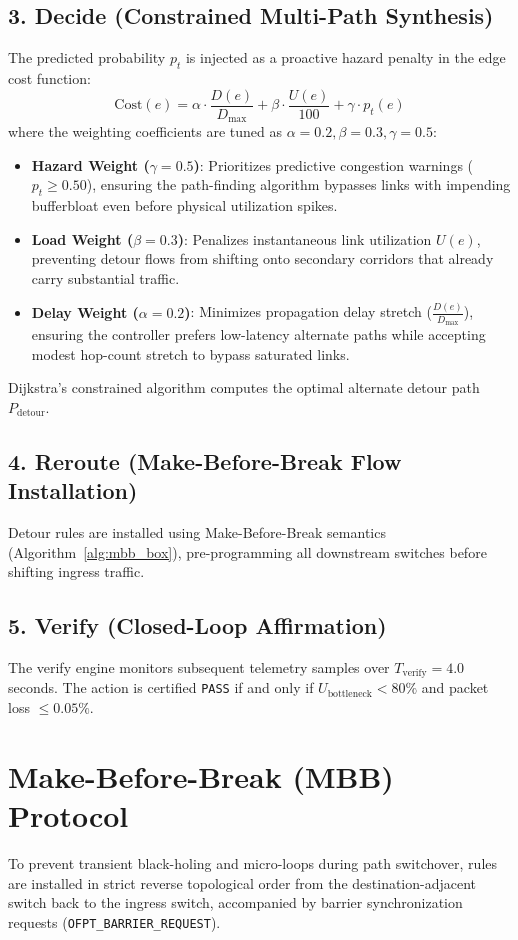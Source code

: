 \subsection{3. Decide (Constrained Multi-Path Synthesis)}
The predicted probability $p_t$ is injected as a proactive hazard penalty in the edge cost function:
\begin{equation}
  \text{Cost}(e) = \alpha \cdot \frac{D(e)}{D_{\text{max}}} + \beta \cdot \frac{U(e)}{100} + \gamma \cdot p_t(e)
\end{equation}
where the weighting coefficients are tuned as $\alpha=0.2, \beta=0.3, \gamma=0.5$:
\begin{itemize}[noitemsep]
  \item \textbf{Hazard Weight ($\gamma = 0.5$)}: Prioritizes predictive congestion warnings ($p_t \ge 0.50$), ensuring the path-finding algorithm bypasses links with impending bufferbloat even before physical utilization spikes.
  \item \textbf{Load Weight ($\beta = 0.3$)}: Penalizes instantaneous link utilization $U(e)$, preventing detour flows from shifting onto secondary corridors that already carry substantial traffic.
  \item \textbf{Delay Weight ($\alpha = 0.2$)}: Minimizes propagation delay stretch ($\frac{D(e)}{D_{\text{max}}}$), ensuring the controller prefers low-latency alternate paths while accepting modest hop-count stretch to bypass saturated links.
\end{itemize}
Dijkstra's constrained algorithm computes the optimal alternate detour path $P_{\text{detour}}$.

\subsection{4. Reroute (Make-Before-Break Flow Installation)}
Detour rules are installed using Make-Before-Break semantics (Algorithm~\ref{alg:mbb_box}), pre-programming all downstream switches before shifting ingress traffic.

\subsection{5. Verify (Closed-Loop Affirmation)}
The verify engine monitors subsequent telemetry samples over $T_{\text{verify}} = 4.0$\,seconds. The action is certified \texttt{PASS} if and only if $U_{\text{bottleneck}} < 80\%$ and packet loss $\le 0.05\%$.

\section{Make-Before-Break (MBB) Protocol}
\label{sec:mbb_protocol}
To prevent transient black-holing and micro-loops during path switchover, rules are installed in strict reverse topological order from the destination-adjacent switch back to the ingress switch, accompanied by barrier synchronization requests (\texttt{OFPT\_BARRIER\_REQUEST}).

